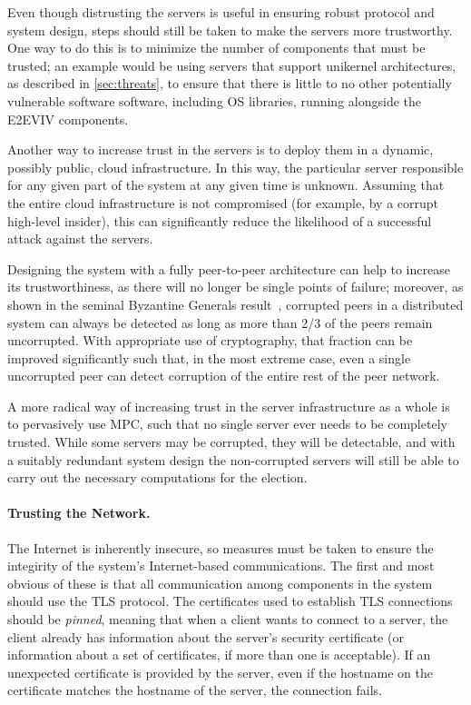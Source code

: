 Even though distrusting the servers is useful in ensuring robust
protocol and system design, steps should still be taken to make the
servers more trustworthy.  One way to do this is to minimize the
number of components that must be trusted; an example would be using
servers that support unikernel architectures, as described in
\autoref{sec:threats}, to ensure that there is little to no other
potentially vulnerable software software, including OS libraries,
running alongside the E2EVIV components.

Another way to increase trust in the servers is to deploy them in a
dynamic, possibly public, cloud infrastructure. In this way, the
particular server responsible for any given part of the system at any
given time is unknown. Assuming that the entire cloud infrastructure
is not compromised (for example, by a corrupt high-level insider),
this can significantly reduce the likelihood of a successful attack
against the servers.

Designing the system with a fully peer-to-peer architecture can help
to increase its trustworthiness, as there will no longer be single
points of failure; moreover, as shown in the seminal Byzantine
Generals result~\cite{Lamport82}, corrupted peers in a distributed
system can always be detected as long as more than 2/3 of the peers
remain uncorrupted. With appropriate use of cryptography, that
fraction can be improved significantly such that, in the most extreme
case, even a single uncorrupted peer can detect corruption of the
entire rest of the peer network.

A more radical way of increasing trust in the server infrastructure as
a whole is to pervasively use MPC, such that no single server ever
needs to be completely trusted. While some servers may be corrupted,
they will be detectable, and with a suitably redundant system design
the non-corrupted servers will still be able to carry out the
necessary computations for the election.

\paragraph{Trusting the Network.} The Internet is inherently insecure,
so measures must be taken to ensure the integirity of the system's
Internet-based communications. The first and most obvious of these is
that all communication among components in the system should use the
TLS protocol. The certificates used to establish TLS connections
should be \emph{pinned}, meaning that when a client wants to connect
to a server, the client already has information about the server's
security certificate (or information about a set of certificates, if
more than one is acceptable). If an unexpected certificate is provided
by the server, even if the hostname on the certificate matches the
hostname of the server, the connection fails.


